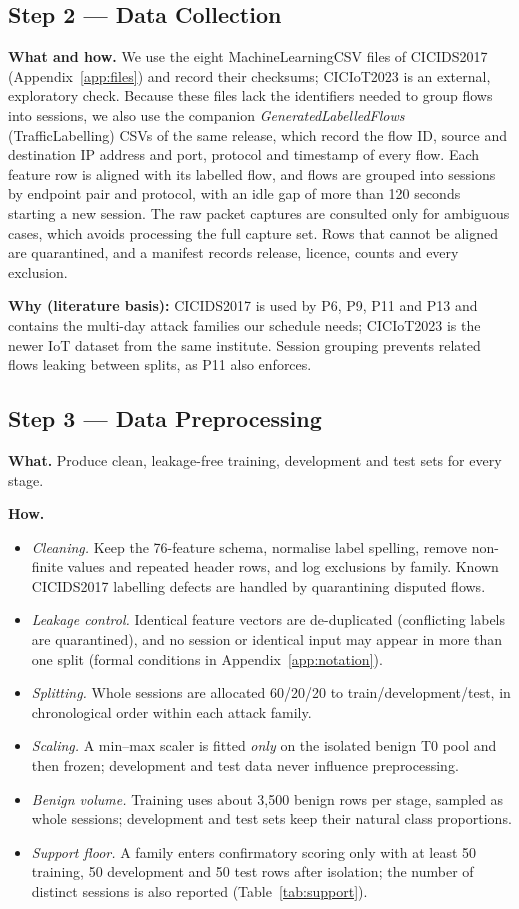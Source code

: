 \documentclass[10pt,a4paper]{article}
\newcommand{\why}[1]{\par\noindent\colorbox{black!5}{\parbox{\dimexpr\linewidth-2\fboxsep}{\small\textbf{Why (literature basis):} #1}}\par}
\begin{document}
\subsection{Step 2 --- Data Collection}
\textbf{What and how.} We use the eight MachineLearningCSV files of CICIDS2017 \cite{dataset} (Appendix~\ref{app:files}) and record their checksums; CICIoT2023 \cite{iot} is an external, exploratory check. Because these files lack the identifiers needed to group flows into sessions, we also use the companion \emph{GeneratedLabelledFlows} (TrafficLabelling) CSVs of the same release, which record the flow ID, source and destination IP address and port, protocol and timestamp of every flow. Each feature row is aligned with its labelled flow, and flows are grouped into sessions by endpoint pair and protocol, with an idle gap of more than 120 seconds starting a new session. The raw packet captures are consulted only for ambiguous cases, which avoids processing the full capture set. Rows that cannot be aligned are quarantined, and a manifest records release, licence, counts and every exclusion.

\why{CICIDS2017 is used by P6, P9, P11 and P13 and contains the multi-day attack families our schedule needs; CICIoT2023 is the newer IoT dataset from the same institute. Session grouping prevents related flows leaking between splits, as P11 also enforces.}

\subsection{Step 3 --- Data Preprocessing}
\textbf{What.} Produce clean, leakage-free training, development and test sets for every stage.

\textbf{How.}
\begin{itemize}
\item \emph{Cleaning.} Keep the 76-feature schema, normalise label spelling, remove non-finite values and repeated header rows, and log exclusions by family. Known CICIDS2017 labelling defects \cite{engelen} are handled by quarantining disputed flows.
\item \emph{Leakage control.} Identical feature vectors are de-duplicated (conflicting labels are quarantined), and no session or identical input may appear in more than one split (formal conditions in Appendix~\ref{app:notation}).
\item \emph{Splitting.} Whole sessions are allocated 60/20/20 to train/development/test, in chronological order within each attack family.
\item \emph{Scaling.} A min--max scaler is fitted \emph{only} on the isolated benign T0 pool and then frozen; development and test data never influence preprocessing.
\item \emph{Benign volume.} Training uses about 3,500 benign rows per stage, sampled as whole sessions; development and test sets keep their natural class proportions.
\item \emph{Support floor.} A family enters confirmatory scoring only with at least 50 training, 50 development and 50 test rows after isolation; the number of distinct sessions is also reported (Table~\ref{tab:support}).
\end{itemize}
\end{document}
